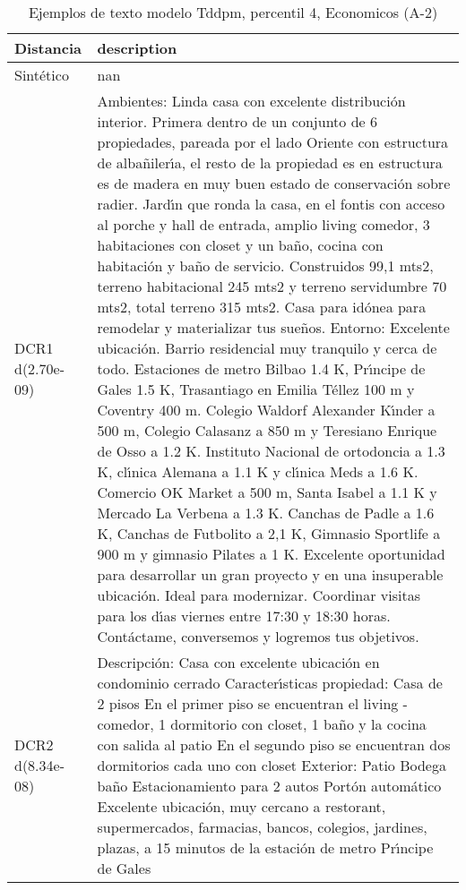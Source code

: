 \begin{table}[H]
\centering
\fontsize{10}{14}\selectfont
\caption{Ejemplos de texto modelo Tddpm, percentil 4, Economicos (A-2)}
\label{table-example-economicos-a-2-tddpm_mlp-4p-text}
\begin{tabular}{|l|m{35em}|}
\hline
\rowcolor[gray]{0.8}
Distancia & description \\
\hline Sintético & nan \\
\hline DCR1 d(2.70e-09) & Ambientes: Linda casa con excelente distribuci\'on interior. Primera dentro de un conjunto de 6 propiedades, pareada por el lado Oriente con estructura de alba\~niler{\'\i}a, el resto de la propiedad es en estructura es de madera en muy buen estado de conservaci\'on sobre radier. Jard{\'\i}n que ronda la casa, en el fontis con acceso al porche y hall de entrada, amplio living comedor, 3 habitaciones con closet y un ba\~no, cocina con habitaci\'on y ba\~no de servicio. Construidos 99,1 mts2, terreno habitacional 245 mts2 y terreno servidumbre 70 mts2, total terreno 315 mts2.   Casa para id\'onea para remodelar y materializar tus sue\~nos.   Entorno: Excelente ubicaci\'on. Barrio residencial muy tranquilo y cerca de todo. Estaciones de metro Bilbao 1.4 K, Pr{\'\i}ncipe de Gales 1.5 K, Trasantiago en Emilia T\'ellez 100 m y Coventry 400 m. Colegio Waldorf Alexander K{\'\i}nder a 500 m, Colegio Calasanz a 850 m y Teresiano Enrique de Osso a 1.2 K. Instituto Nacional de ortodoncia a 1.3 K, cl{\'\i}nica Alemana a 1.1 K y cl{\'\i}nica Meds a 1.6 K. Comercio OK Market a 500 m, Santa Isabel a 1.1 K y Mercado La Verbena a 1.3 K. Canchas de Padle a 1.6 K, Canchas de Futbolito a 2,1 K, Gimnasio Sportlife a 900 m y gimnasio Pilates a 1 K.  Excelente oportunidad para desarrollar un gran proyecto y en una insuperable ubicaci\'on.  Ideal para modernizar.  Coordinar visitas para los d{\'\i}as viernes entre 17:30 y 18:30 horas.  Cont\'actame, conversemos y logremos tus objetivos. \\
\hline DCR2 d(8.34e-08) & Descripci\'on:  Casa con excelente ubicaci\'on en condominio cerrado  Caracter{\'\i}sticas propiedad:  Casa de 2 pisos  En el primer piso se encuentran el living - comedor, 1 dormitorio con closet, 1 ba\~no y la cocina con salida al patio
 En el segundo piso se encuentran dos dormitorios cada uno con closet  Exterior:  Patio Bodega ba\~no Estacionamiento para 2 autos Port\'on autom\'atico   Excelente ubicaci\'on, muy cercano a restorant, supermercados, farmacias, bancos, colegios, jardines, plazas, a 15 minutos de la estaci\'on de metro Pr{\'\i}ncipe de Gales \\
\hline
\end{tabular}
\end{table}
